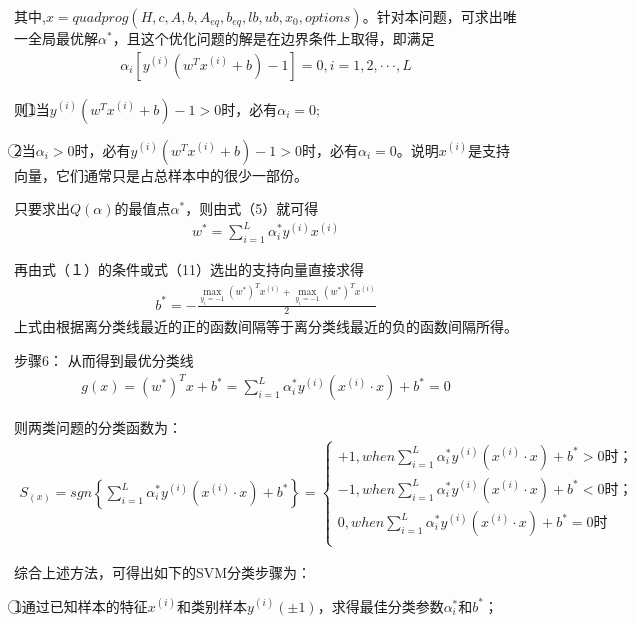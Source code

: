 \documentclass[12pt,a4paper]{article}%
\begin{document}
	其中,$x=quadprog(H,c,A,b,{A}_{eq},{b}_{eq},lb,ub,{x}_{0},options)$。针对本问题，可求出唯一全局最优解${\alpha}^{*}$，且这个优化问题的解是在边界条件上取得，即满足
	\begin{align}
		{\alpha}_{i}\left[{y}^{(i)}{({w}^{T}{x}^{(i)}+b)}-1\right]=0,i=1,2,···,L
	\end{align}	
	
	则\textcircled{1}当${y}^{(i)}{({w}^{T}{x}^{(i)}+b)}-1>0$时，必有${\alpha}_{i}=0$;
	
	\textcircled{2}当${\alpha}_{i}>0$时，必有${y}^{(i)}{({w}^{T}{x}^{(i)}+b)}-1>0$时，必有${\alpha}_{i}=0$。说明${x}^{(i)}$是支持向量，它们通常只是占总样本中的很少一部份。
	
	只要求出$Q(\alpha)$的最值点${\alpha}^{*}$，则由式（5）就可得
	\begin{align}
		{w}^{*}=\sum_{i=1}^{L} {\alpha }_{i}^{*}{y}^{(i)}{x}^{(i)}
	\end{align}			
	
	再由式（１）的条件或式（11）选出的支持向量直接求得
	\begin{align}
		{b}^{*}=-\frac{\max\limits_{{y}_{i}=-1} {({w}^{*})}^{T}{x}^{(i)}+\max\limits_{{y}_{i}=-1}{({w}^{*})}^{T}{x}^{(i)}}{2}
	\end{align}		
	上式由根据离分类线最近的正的函数间隔等于离分类线最近的负的函数间隔所得。
	
	步骤6：
	从而得到最优分类线
	\begin{align}
		g(x)={({w}^{*})}^{T}x+{b}^{*}=\sum_{i=1}^{L} {\alpha}_{i}^{*}{y}^{(i)}({x}^{(i)}·x)+{b}^{*}=0
	\end{align}	
	
	则两类问题的分类函数为：
	\begin{align}
		{S}_{(x)}=sgn\left\{\sum_{i=1}^{L} {\alpha}_{i}^{*}{y}^{(i)}({x}^{(i)}·x)+{b}^{*}\right\}=	
		\begin{cases}  
			+1,when\sum_{i=1}^{L} {\alpha}_{i}^{*}{y}^{(i)}({x}^{(i)}·x)+{b}^{*}>0时；\\ 
			-1,when\sum_{i=1}^{L} {\alpha}_{i}^{*}{y}^{(i)}({x}^{(i)}·x)+{b}^{*}<0时；\\
			0,when\sum_{i=1}^{L} {\alpha}_{i}^{*}{y}^{(i)}({x}^{(i)}·x)+{b}^{*}=0时 \\ \end{cases} 
	\end{align}	
	
	综合上述方法，可得出如下的SVM分类步骤为：
	
	\textcircled{1}通过已知样本的特征${x}^{(i)}$和类别样本${y}^{(i)}(\pm1)$，求得最佳分类参数${\alpha}_{i}^{*}$和${b}^{*}$；
	
\end{document}
